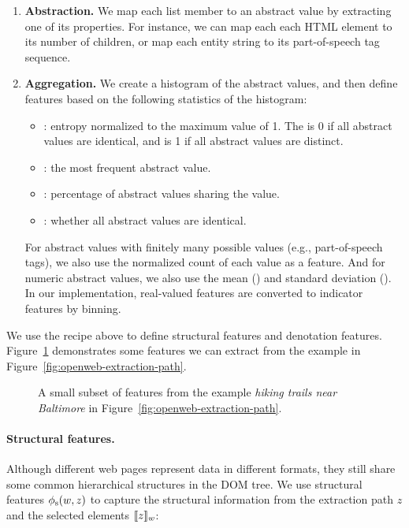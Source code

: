 \begin{enumerate}
\item
\textbf{Abstraction.}
We map each list member to an abstract value
by extracting one of its properties.
For instance, we can map each each HTML element
to its number of children,
or map each entity string to its part-of-speech tag sequence.
\item
\textbf{Aggregation.}
We create a histogram of the abstract values,
and then define features based on the following statistics
of the histogram:
\begin{itemize}
\item {}: entropy normalized to the maximum value of 1.
The  is 0 if all abstract values are identical,
and is 1 if all abstract values are distinct.
\item {}: the most frequent abstract value.
\item {}: percentage of abstract values
sharing the  value.
\item {}: whether all abstract values are identical.
\end{itemize}
For abstract values with finitely many possible values
(e.g., part-of-speech tags),
we also use the normalized count of each value as a feature.
And for numeric abstract values,
we also use the mean () and standard deviation ().
In our implementation,
real-valued features are converted to indicator features by binning.
\end{enumerate}

We use the recipe above to define structural features
and denotation features.
Figure~\ref{fig:openweb-features}
demonstrates some features we can extract from
the example in Figure~\ref{fig:openweb-extraction-path}.

\begin{figure}[t]
\centering

\caption[
A small subset of features from the example \emph{hiking trails near Baltimore}.
]{A small subset of features from the example \emph{hiking trails near Baltimore} in Figure~\ref{fig:openweb-extraction-path}.}
\label{fig:openweb-features}
\end{figure}

\paragraph{Structural features.}
Although different web pages represent data in different formats,
they still share some common hierarchical structures in the DOM tree.
We use structural features $\phi_\mathrm{s}(w, z)$
to capture the structural information
from the extraction path $z$ and the selected elements $\llbracket{z}\rrbracket_{w}$:

